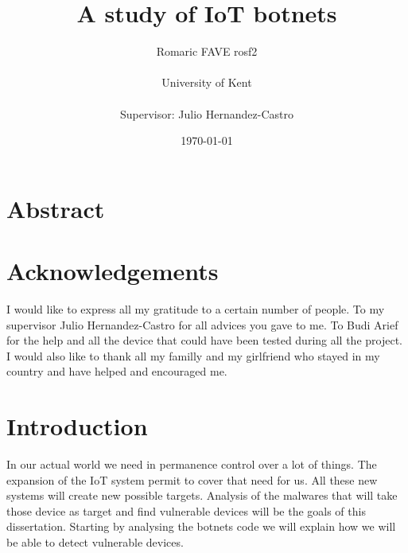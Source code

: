 \documentclass{report}
\date{\monthyeardate\today}
\begin{document}
\title{A study of IoT botnets}
\author{Romaric FAVE rosf2\\
  \\
  University of Kent\\
  \\
  Supervisor: Julio Hernandez-Castro
}

\maketitle

\tableofcontents

\chapter*{Abstract}


\chapter*{Acknowledgements}
I would like to express all my gratitude to a certain number of people.\newline
To my supervisor Julio Hernandez-Castro for all advices you gave to me.\newline
To Budi Arief for the help and all the device that could have been tested during all the project.\newline
I would also like to thank all my familly and my girlfriend who stayed in my country and have helped and encouraged me.

\chapter{Introduction}
In our actual world we need in permanence control over a lot of things. The expansion of the IoT system permit to cover that need for us. All these new systems will create new possible targets. Analysis of the malwares that will take those device as target and find vulnerable devices will be the goals of this dissertation.\newline
Starting by analysing the botnets code we will explain how we will be able to detect vulnerable devices.
\end{document}
